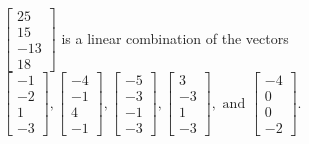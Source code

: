 \begin{exercise}
\begin{exerciseStatement}
  \end{exerciseStatement}
  \begin{exerciseAnswer}
   \(\left[\begin{array}{c}
25 \\
15 \\
-13 \\
18
\end{array}\right]\) 
  	 is  
	a linear combination of the vectors \(\left[\begin{array}{c}
-1 \\
-2 \\
1 \\
-3
\end{array}\right] , \left[\begin{array}{c}
-4 \\
-1 \\
4 \\
-1
\end{array}\right] , \left[\begin{array}{c}
-5 \\
-3 \\
-1 \\
-3
\end{array}\right] , \left[\begin{array}{c}
3 \\
-3 \\
1 \\
-3
\end{array}\right] , \text{ and } \left[\begin{array}{c}
-4 \\
0 \\
0 \\
-2
\end{array}\right]\).

	
  


  \end{exerciseAnswer}
\end{exercise}